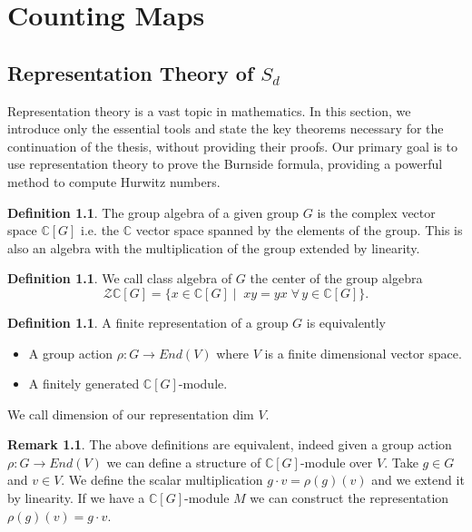 \documentclass[12pt,a4paper,openright,twoside]{report}
\theoremstyle{definition} %
\newtheorem{definition}[theorem]{Definition}
\newtheorem{remark}[theorem]{Remark}
\def \C {\mathbb{C}}
\def \ZZ {\mathcal{Z}}
\begin{document}
\chapter{Counting Maps}\label{chap.CountMaps}
\lhead[\fancyplain{}{\bfseries\thepage}]{\fancyplain{}{\bfseries\rightmark}}

\section{Representation Theory of \(S_d\)}
Representation theory is a vast topic in mathematics. In this section, we introduce only the essential tools and state the key theorems necessary for the continuation of the thesis, without providing their proofs. Our primary goal is to use representation theory to prove the Burnside formula, providing a powerful method to compute Hurwitz numbers.

\begin{definition}
    The group algebra of a given group \(G\) is the complex vector space \(\C[G]\) i.e. the \(\C\) vector space spanned by the elements of the group. This is also an algebra with the multiplication of the group extended by linearity.
\end{definition}

\begin{definition}
    We call class algebra of \(G\) the center of the group algebra
    \[
    \ZZ \C[G] = \{x \in \C[G] \mid \; xy = yx \; \forall \, y \in \C[G]\}.
    \]
\end{definition}

\begin{definition}
     A finite representation of a group \(G\) is equivalently
     \begin{itemize}
         \item A group action \(\rho:G \to End(V)\) where \(V\) is a finite dimensional vector space.
         \item A finitely generated \(\C[G]\)-module.
     \end{itemize}
     We call dimension of our representation dim \(V\).
\end{definition}

\begin{remark}\label{rem:equivalence-def-representation}
The above definitions are equivalent, indeed given a group action \(\rho: G \to End(V)\) we can define a structure of \(\C[G]\)-module over \(V\). Take \(g \in G\) and \(v \in V\). We define the scalar multiplication \(g \cdot v = \rho(g)(v)\) and we extend it by linearity. If we have a \(\C[G]\)-module \(M\) we can construct the representation \(\rho(g)(v) = g \cdot v\).
\end{remark}
\end{document}

